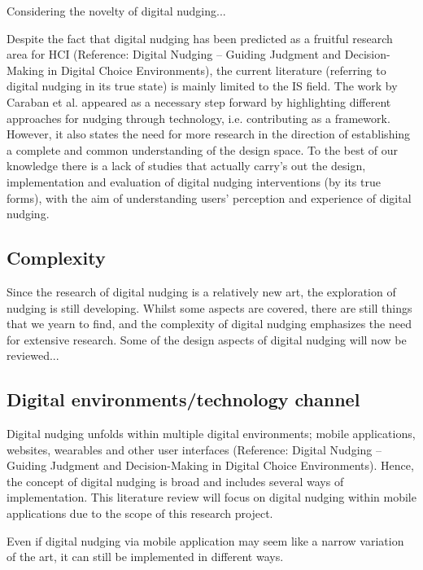 Considering the novelty of digital nudging...

Despite the fact that digital nudging has been predicted as a fruitful research area for HCI (Reference: Digital Nudging – Guiding Judgment and Decision-Making in Digital Choice Environments), the current literature (referring to digital nudging in its true state) is mainly limited to the IS field. The work by Caraban et al. appeared as a necessary step forward by highlighting different approaches for nudging through technology, i.e. contributing as a framework. However, it also states the need for more research in the direction of establishing a complete and common understanding of the design space. To the best of our knowledge there is a lack of studies that actually carry's out the design, implementation and evaluation  of digital nudging interventions (by its true forms), with the aim of understanding users' perception and experience of digital nudging.


\subsection{Complexity}
Since the research of digital nudging is a relatively new art, the exploration of nudging is still developing. Whilst some aspects are covered, there are still things that we yearn to find, and the complexity of digital nudging emphasizes the need for extensive research. Some of the design aspects of digital nudging will now be reviewed...

\subsection{Digital environments/technology channel}
Digital nudging unfolds within multiple digital environments; mobile applications, websites, wearables and other user interfaces (Reference: Digital Nudging – Guiding Judgment and Decision-Making in Digital Choice Environments). Hence, the concept of digital nudging is broad and includes several ways of implementation. This literature review will focus on digital nudging within mobile applications due to the scope of this research project. 

Even if digital nudging via mobile application may seem like a narrow variation of the art, it can still be implemented in different ways. 

